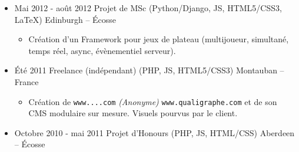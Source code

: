 \documentclass{res}
\begin{document}
\begin{resume}
\begin{itemize}
\begin{itemize}
			\begin{itemize}
				\item[+] l'am\'elioration de performances g\'en\'erales (r\'eseau, bases de donn\'ees, algorithmie).
				\item[+] la r\'eplication de donn\'ees \`a travers des milliers de n\oe{}uds. Donn\'ees statiques, ou extr\^emement dynamiques.
				\item[+] la conception et l'impl\'ementation de types abstraits cohérents pour relier Oracle $\rightleftarrows$ C++ $\rightleftarrows$ Sqlite $\rightleftarrows$ Python.
				\item[+] divers scripts pour prototyper, acc\'el\'erer ou automatiser des t\^aches : stockage~/ r\'ecup\'eration~/ backup\textellipsis
				\item[+] l'export de donn\'ees depuis nos caches vers deux it\'erations successives de XMLs, en g\'en\'erant des XSLTs et des XSDs \`a partir de meta-XSLTs. Cela nous a permis de publier du XML avec diff\'erentes versions de schemas.
				\item[+] la conception et l'impl\'ementation d'un algorithme de Hepburn modifi\'e pour la translitt\'eration du japonais.
				\item[+] la d\'ecommission de commandes de terminaux depuis TPF (IBM) vers une nouvelle architecture en C++.
			\end{itemize}
		\end{itemize}
		\item[] Mai 2012 - ao\^ut 2012 \tabto{5cm} Projet de MSc (Python/Django, JS, HTML5/CSS3, \LaTeX{}) \hfill Edinburgh -- \'Ecosse
		\begin{itemize}
			\item[] Cr\'eation d'un Framework pour jeux de plateau (multijoueur, simultan\'e, temps r\'eel, async, \'ev\`enementiel serveur).
		\end{itemize}
		\item[] \'Et\'e 2011 \tabto{5cm} Freelance (ind\'ependant) (PHP, JS, HTML5/CSS3) \hfill Montauban -- France
		\begin{itemize}
			\item[] Cr\'eation de \ifisanon \texttt{www....com} \textit{(Anonyme)} \else \texttt{www.qualigraphe.com} \fi et de son CMS modulaire sur mesure. Visuels pourvus par le client.
		\end{itemize}
		\item[] Octobre 2010 - mai 2011 \tabto{5cm} Projet d'Honours (PHP, JS, HTML/CSS) \hfill Aberdeen -- \'Ecosse
		\begin{itemize}

\end{itemize}
\end{itemize}
\end{resume}
\end{document}

